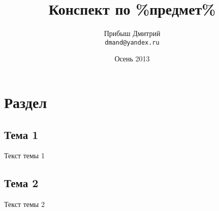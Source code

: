 \documentclass[a4paper,12pt]{report}
\author{Прибыш Дмитрий\\
  \texttt{dmand@yandex.ru}}
\title{Конспект по \%предмет\%}
\date{Осень 2013}
\begin{document}
\maketitle
\tableofcontents
\chapter{Раздел}
\section{Тема 1}
Текст темы 1
\section{Тема 2}
Текст темы 2
\end{document}
